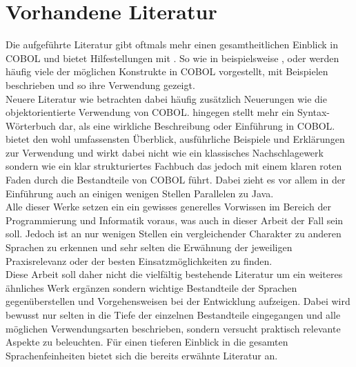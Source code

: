 \section{Vorhandene Literatur}
Die aufgeführte Literatur gibt oftmals mehr einen gesamtheitlichen Einblick in COBOL und bietet Hilfestellungen mit . So wie in beispielsweise ,   oder  werden häufig viele der möglichen Konstrukte in COBOL vorgestellt, mit Beispielen beschrieben und so ihre Verwendung gezeigt. 
\\
Neuere Literatur wie  betrachten dabei häufig zusätzlich Neuerungen wie die objektorientierte Verwendung von COBOL.  
hingegen stellt mehr ein Syntax-Wörterbuch dar, als eine wirkliche Beschreibung oder Einführung in COBOL.
\\
 bietet den wohl umfassensten Überblick, ausführliche Beispiele und Erklärungen zur Verwendung und wirkt dabei nicht wie ein klassisches Nachschlagewerk sondern wie ein klar strukturiertes Fachbuch das jedoch mit einem klaren roten Faden durch die Bestandteile von COBOL führt. Dabei zieht es vor allem in der Einführung auch an einigen wenigen Stellen Parallelen zu Java. 
\\
Alle dieser Werke setzen ein ein gewisses generelles Vorwissen im Bereich der Programmierung und Informatik voraus, was auch in dieser Arbeit der Fall sein soll. Jedoch ist an nur wenigen Stellen ein vergleichender Charakter zu anderen Sprachen zu erkennen und sehr selten die Erwähnung der jeweiligen Praxisrelevanz oder der besten Einsatzmöglichkeiten zu finden. 
\\
Diese Arbeit soll daher nicht die vielfältig bestehende Literatur um ein weiteres ähnliches Werk ergänzen sondern wichtige Bestandteile der Sprachen gegenüberstellen und Vorgehensweisen bei der Entwicklung aufzeigen. Dabei wird bewusst nur selten in die Tiefe der einzelnen Bestandteile eingegangen und alle möglichen Verwendungsarten beschrieben, sondern versucht praktisch relevante Aspekte zu beleuchten. Für einen tieferen Einblick in die gesamten Sprachenfeinheiten bietet sich die bereits erwähnte Literatur an.

